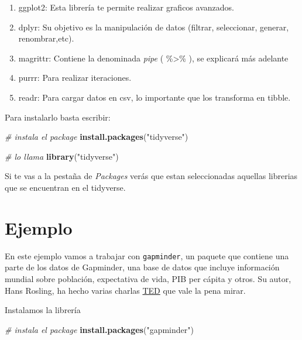 \documentclass[12pt,]{book}
\newenvironment{Shaded}{\begin{snugshade}}{\end{snugshade}}
\newcommand{\KeywordTok}[1]{\textcolor[rgb]{0.13,0.29,0.53}{\textbf{#1}}}
\newcommand{\StringTok}[1]{\textcolor[rgb]{0.31,0.60,0.02}{#1}}
\newcommand{\CommentTok}[1]{\textcolor[rgb]{0.56,0.35,0.01}{\textit{#1}}}
\newcommand{\NormalTok}[1]{#1}
\providecommand{\tightlist}{%
  \setlength{\itemsep}{0pt}\setlength{\parskip}{0pt}}
\begin{document}
\begin{enumerate}
\def\labelenumi{\arabic{enumi}.}
\tightlist
\item
  ggplot2: Esta librería te permite realizar graficos avanzados.
\item
  dplyr: Su objetivo es la manipulación de datos (filtrar, seleccionar,
  generar, renombrar,etc).
\item
  magrittr: Contiene la denominada \emph{pipe} ( \%\textgreater{}\% ),
  se explicará más adelante
\item
  purrr: Para realizar iteraciones.
\item
  readr: Para cargar datos en csv, lo importante que los transforma en
  tibble.
\end{enumerate}

Para instalarlo basta escribir:

\begin{Shaded}
\begin{Highlighting}[]
\CommentTok{# instala el package}
\KeywordTok{install.packages}\NormalTok{(}\StringTok{"tidyverse"}\NormalTok{)}

\CommentTok{# lo llama}
\KeywordTok{library}\NormalTok{(}\StringTok{"tidyverse"}\NormalTok{)}
\end{Highlighting}
\end{Shaded}

Si te vas a la pestaña de \emph{Packages} verás que estan seleccionadas
aquellas librerias que se encuentran en el tidyverse.

\vspace{-27pt}

\section{Ejemplo}\label{ejemplo}

En este ejemplo vamos a trabajar con \texttt{gapminder}, un paquete que
contiene una parte de los datos de Gapminder, una base de datos que
incluye información mundial sobre población, expectativa de vida, PIB
per cápita y otros. Su autor, Hans Rosling, ha hecho varias charlas
\href{https://www.ted.com/playlists/474/the_best_hans_rosling_talks_yo}{TED}
que vale la pena mirar.

Instalamos la librería

\begin{Shaded}
\begin{Highlighting}[]
\CommentTok{# instala el package}
\KeywordTok{install.packages}\NormalTok{(}\StringTok{"gapminder"}\NormalTok{)}
\end{Highlighting}
\end{Shaded}
\end{document}
